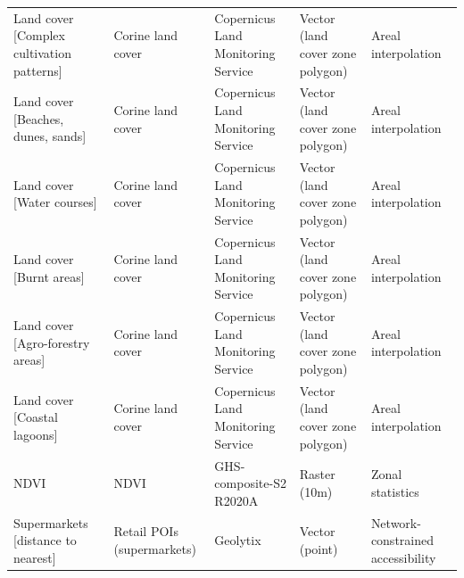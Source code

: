 \documentclass[fleqn,10pt]{wlscirep}
\begin{document}
\begin{longtable}{p{}p{}p{}p{}p{}}
                                                                Land cover [Complex cultivation patterns] &                  Corine land cover  &                                         Copernicus Land Monitoring Service  &  Vector (land cover zone polygon)  &                            Areal interpolation  \\
                                                                        Land cover [Beaches, dunes, sands] &                  Corine land cover  &                                         Copernicus Land Monitoring Service  &  Vector (land cover zone polygon)  &                            Areal interpolation  \\
                                                                                Land cover [Water courses] &                  Corine land cover  &                                         Copernicus Land Monitoring Service  &  Vector (land cover zone polygon)  &                            Areal interpolation  \\
                                                                                Land cover [Burnt areas] &                  Corine land cover  &                                         Copernicus Land Monitoring Service  &  Vector (land cover zone polygon)  &                            Areal interpolation  \\
                                                                        Land cover [Agro-forestry areas] &                  Corine land cover  &                                         Copernicus Land Monitoring Service  &  Vector (land cover zone polygon)  &                            Areal interpolation  \\
                                                                            Land cover [Coastal lagoons] &                  Corine land cover  &                                         Copernicus Land Monitoring Service  &  Vector (land cover zone polygon)  &                            Areal interpolation  \\
                                                                                                    NDVI &                               NDVI  &                                                    GHS-composite-S2 R2020A  &                      Raster (10m)  &                               Zonal statistics  \\
                                                                        Supermarkets [distance to nearest] &         Retail POIs (supermarkets)  &                                                                   Geolytix  &                    Vector (point)  &              Network-constrained accessibility  \\

\end{longtable}
\end{document}
